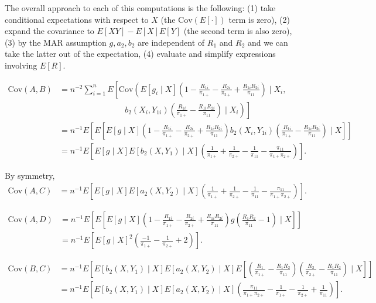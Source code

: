 \documentclass[12pt]{article}
\newcommand{\Cov}{{\text{Cov}}}
\begin{document}
\begin{itemize}
    The overall approach to each of this computations is the following:
    (1) take conditional expectations with respect to $X$ (the $\Cov(E[\cdot])$
    term is zero), (2) expand the covariance to $E[XY] - E[X]E[Y]$ (the second
    term is also zero), (3) by the MAR assumption $g, a_2, b_2$ are independent
    of $R_1$ and $R_2$ and we can take the latter out of the expectation, (4)
    evaluate and simplify expressions involving $E[R]$.
  
    \begin{align*}
      \Cov(A, B) &= n^{-2} \sum_{i = 1}^n E\left[\Cov\left(E[g_i \mid X] \left(1
      - \frac{R_{1i}}{\pi_{1+}} - \frac{R_{2i}}{\pi_{2+}} +
      \frac{R_{1i}R_{2i}}{\pi_{11}}\right) \mid X_i,\right. \right.\\
      &\qquad \qquad \qquad \qquad b_2(X_i, Y_{1i}) \left. \left.
      \left(\frac{R_{1i}}{\pi_{1+}} - \frac{R_{1i}R_{2i}}{\pi_{11}}\right) \mid
      X_i\right)\right]\\
      &= n^{-1} E\left[E\left[E[g \mid X] \left(1 - \frac{R_{1i}}{\pi_{1+}} -
      \frac{R_{2i}}{\pi_{2+}} + \frac{R_{1i}R_{2i}}{\pi_{11}}\right)
      b_2(X_i, Y_{1i}) \left(\frac{R_{1i}}{\pi_{1+}} -
      \frac{R_{1i}R_{2i}}{\pi_{11}}\right) \mid X \right]\right] \\
      &= n^{-1} E\left[E[g \mid X] E[b_2(X, Y_1) \mid X]
      \left(\frac{1}{\pi_{1+}} + \frac{1}{\pi_{2+}} - \frac{1}{\pi_{11}} -
      \frac{\pi_{11}}{\pi_{1+} \pi_{2+}}\right)\right].
    \end{align*}

    By symmetry,
    \begin{align*}
      \Cov(A, C) 
      &= n^{-1} E\left[E[g \mid X] E[a_2(X, Y_2) \mid X]
      \left(\frac{1}{\pi_{1+}} + \frac{1}{\pi_{2+}} - \frac{1}{\pi_{11}} -
      \frac{\pi_{11}}{\pi_{1+} \pi_{2+}}\right)\right].
    \end{align*}

    \begin{align*}
      \Cov(A, D) &= n^{-1} E\left[E\left[E[g \mid X] \left(1 -
      \frac{R_{1i}}{\pi_{1+}} - \frac{R_{2i}}{\pi_{2+}} +
      \frac{R_{1i}R_{2i}}{\pi_{11}}\right) g \left(\frac{R_1 R_2}{\pi_{11}} -
      1\right) \mid X\right] \right]\\
      &= n^{-1} E\left[E[g \mid X]^2 \left(\frac{-1}{\pi_{1+}} -
      \frac{1}{\pi_{2+}} + 2\right)\right].
    \end{align*}

    \begin{align*}
      \Cov(B, C) &= n^{-1} E\left[E[b_2(X, Y_1) \mid X] E[a_2(X, Y_2) \mid X]
      E\left[\left(\frac{R_1}{\pi_{1+}} - \frac{R_1 R_2}{\pi_{11}}\right)
      \left(\frac{R_2}{\pi_{2+}} - \frac{R_1 R_2}{\pi_{11}}\right) \mid
      X\right]\right]\\
      &= n^{-1} E\left[E[b_2(X, Y_1) \mid X] E[a_2(X, Y_2) \mid X]
      \left(\frac{\pi_{11}}{\pi_{1+} \pi_{2+}} - \frac{1}{\pi_{1+}} -
      \frac{1}{\pi_{2+}} + \frac{1}{\pi_{11}}\right)\right].
    \end{align*}


\end{itemize}
\end{document}
